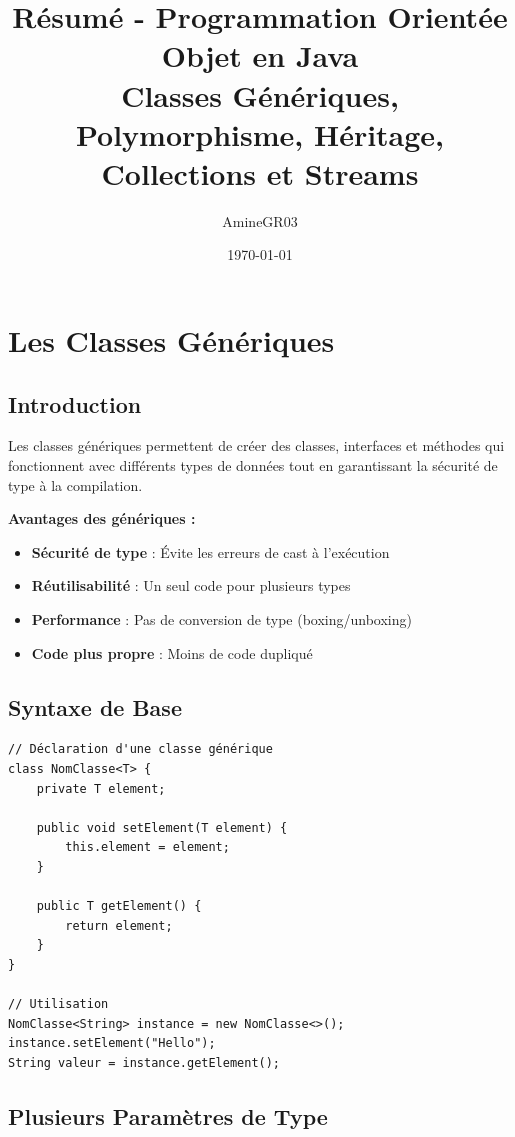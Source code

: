 \documentclass[11pt,a4paper]{article}
\title{Résumé - Programmation Orientée Objet en Java\\
\large Classes Génériques, Polymorphisme, Héritage, Collections et Streams}
\author{AmineGR03}
\date{\today}
\begin{document}
\maketitle

\tableofcontents
\newpage

\section{Les Classes Génériques}

\subsection{Introduction}

Les classes génériques permettent de créer des classes, interfaces et méthodes qui fonctionnent avec différents types de données tout en garantissant la sécurité de type à la compilation.

\begin{importantbox}
\textbf{Avantages des génériques :}
\begin{itemize}
    \item \textbf{Sécurité de type} : Évite les erreurs de cast à l'exécution
    \item \textbf{Réutilisabilité} : Un seul code pour plusieurs types
    \item \textbf{Performance} : Pas de conversion de type (boxing/unboxing)
    \item \textbf{Code plus propre} : Moins de code dupliqué
\end{itemize}
\end{importantbox}

\subsection{Syntaxe de Base}

\begin{lstlisting}
// Déclaration d'une classe générique
class NomClasse<T> {
    private T element;
    
    public void setElement(T element) {
        this.element = element;
    }
    
    public T getElement() {
        return element;
    }
}

// Utilisation
NomClasse<String> instance = new NomClasse<>();
instance.setElement("Hello");
String valeur = instance.getElement();
\end{lstlisting}

\subsection{Plusieurs Paramètres de Type}
\end{document}
